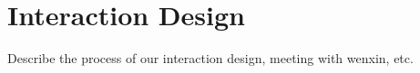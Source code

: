 \chapter{Interaction Design}
Describe the process of our interaction design, meeting with wenxin, etc.
